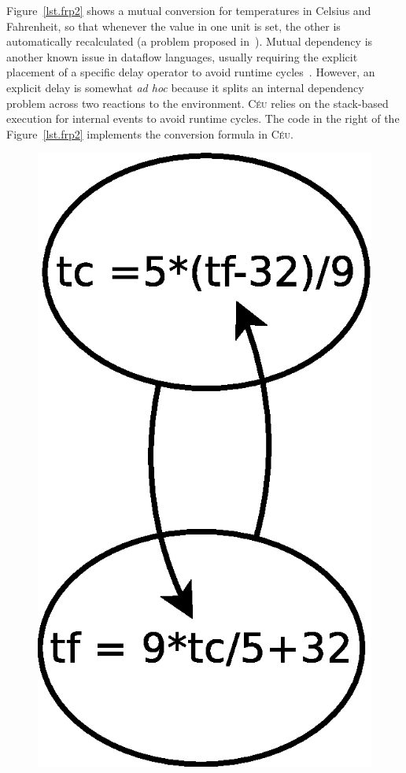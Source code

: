 \documentclass{acm_proc_article-sp}
\newcommand{\CEU}{\textsc{C\'{e}u}\xspace}
\newcommand{\1}{\;}
\newcommand{\2}{\;\;}
\newcommand{\3}{\;\;\;}
\newcommand{\5}{\;\;\;\;\;}
\begin{document}
Figure~\ref{lst.frp2} shows a mutual conversion for temperatures in Celsius and 
Fahrenheit, so that whenever the value in one unit is set, the other is 
automatically recalculated (a problem proposed in~\cite{frp.survey}).
%
Mutual dependency is another known issue in dataflow languages, usually 
requiring the explicit placement of a specific delay operator to avoid runtime
cycles~\cite{frtime.embedding,luagravity.sblp}.
%
However, an explicit delay is somewhat \emph{ad hoc} because it splits an 
internal dependency problem across two reactions to the environment.
%
\CEU relies on the stack-based execution for internal events to avoid runtime 
cycles.
%
The code in the right of the Figure~\ref{lst.frp2} implements the conversion 
formula in \CEU.
%
\begin{figure}[t]
\begin{minipage}[t]{0.22\linewidth}
\vspace{15pt}
\hspace{0.0cm}
\includegraphics[width=\textwidth]{c2f}

\end{minipage}
\end{figure}
\end{document}
